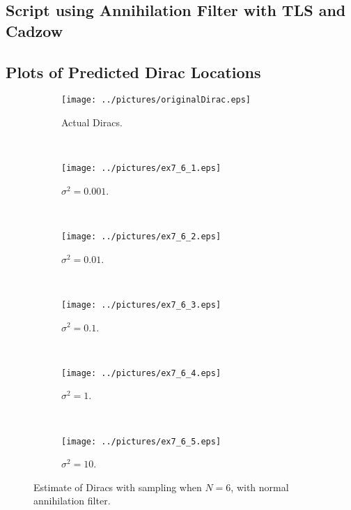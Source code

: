 \documentclass[11pt,a4paper]{report}
\begin{document}
\subsection{Script using Annihilation Filter with TLS and Cadzow}

\newpage

\subsection{Plots of Predicted Dirac Locations}
\begin{figure}[!ht]
    \captionsetup[subfigure]{position=b}
    \centering
    \begin{subfigure}{0.49\textwidth}
        \texttt{[image: ../pictures/originalDirac.eps]}
        \caption{Actual Diracs.}
        \label{fig:ex7_6_0}
    \end{subfigure}
    ~
    \begin{subfigure}{0.49\textwidth}
        \texttt{[image: ../pictures/ex7\_6\_1.eps]}
        \caption{$\sigma^2 = 0.001$.}
        \label{fig:ex7_6_1}
    \end{subfigure}
    \\
    \begin{subfigure}{0.49\textwidth}
        \texttt{[image: ../pictures/ex7\_6\_2.eps]}
        \caption{$\sigma^2 = 0.01$.}
        \label{fig:ex7_6_2}
    \end{subfigure}
    ~
    \begin{subfigure}{0.49\textwidth}
        \texttt{[image: ../pictures/ex7\_6\_3.eps]}
        \caption{$\sigma^2 = 0.1$.}
        \label{fig:ex7_6_3}
    \end{subfigure}
    \\
    \begin{subfigure}{0.49\textwidth}
        \texttt{[image: ../pictures/ex7\_6\_4.eps]}
        \caption{$\sigma^2 = 1$.}
        \label{fig:ex7_6_4}
    \end{subfigure}
    ~
    \begin{subfigure}{0.49\textwidth}
        \texttt{[image: ../pictures/ex7\_6\_5.eps]}
        \caption{$\sigma^2 = 10$.}
        \label{fig:ex7_6_5}
    \end{subfigure}

    \caption{Estimate of Diracs with sampling when $N = 6$, with normal annihilation filter.}
    \label{fig:ex7_6}
\end{figure}
\end{document}
